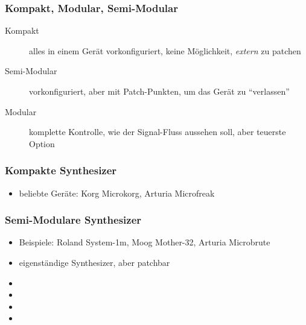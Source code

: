 \documentclass[11pt,ngerman]{beamer}
\begin{document}
\begin{frame}
\frametitle{Kompakt, Modular, Semi-Modular}

\begin{description}
\item [Kompakt] alles in einem Gerät vorkonfiguriert, keine Möglichkeit, \textit{extern} zu patchen
\item [Semi-Modular] vorkonfiguriert, aber mit Patch-Punkten, um das Gerät zu \enquote{verlassen}
\item [Modular] komplette Kontrolle, wie der Signal-Fluss aussehen soll, aber teuerste Option
\end{description}
\end{frame}




 
\begin{frame}
\frametitle{Kompakte Synthesizer}

\begin{itemize}
\item beliebte Geräte: Korg Microkorg, Arturia Microfreak
\end{itemize}
\end{frame}
 
 
 \begin{frame}
 \frametitle{Semi-Modulare Synthesizer}
  
 \begin{itemize}
 \item Beispiele: Roland System-1m, Moog Mother-32, Arturia Microbrute
 \item eigenständige Synthesizer, aber patchbar 
 \item 
 \item 
 \item 
 \item 
 \end{itemize}
 \end{frame}
 
 
 
 
\end{document}

